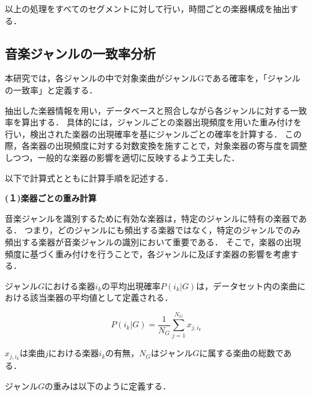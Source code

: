 


以上の処理をすべてのセグメントに対して行い，時間ごとの楽器構成を抽出する．

\subsection{音楽ジャンルの一致率分析}
本研究では，各ジャンルの中で対象楽曲がジャンルGである確率を，「ジャンルの一致率」と定義する．

抽出した楽器情報を用い，データベースと照合しながら各ジャンルに対する一致率を算出する．
具体的には，ジャンルごとの楽器出現頻度を用いた重み付けを行い，検出された楽器の出現確率を基にジャンルごとの確率を計算する．
この際，各楽器の出現頻度に対する対数変換を施すことで，対象楽器の寄与度を調整しつつ，一般的な楽器の影響を適切に反映するよう工夫した．

以下で計算式とともに計算手順を記述する．

\textbf{(１)楽器ごとの重み計算}

音楽ジャンルを識別するために有効な楽器は，特定のジャンルに特有の楽器である．
つまり，どのジャンルにも頻出する楽器ではなく，特定のジャンルでのみ頻出する楽器が音楽ジャンルの識別において重要である．
そこで，楽器の出現頻度に基づく重み付けを行うことで，各ジャンルに及ぼす楽器の影響を考慮する．

ジャンル$G$における楽器$i_k$の平均出現確率$P(i_k|G)$は，データセット内の楽曲における該当楽器の平均値として定義される．

\begin{equation}
	P(i_k | G) = \frac{1}{N_G} \sum_{j=1}^{N_G} x_{j, i_k}
\end{equation}

$x_{j, i_k}$は楽曲$j$における楽器$i_k$の有無，$N_G$はジャンル$G$に属する楽曲の総数である．

ジャンル$G$の重みは以下のように定義する．

